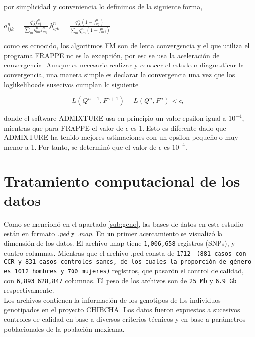por simplicidad y conveniencia lo definimos de la siguiente forma,\\

\begin{center}
$a_{ijk}^{n} = \frac{q_{ik}^{n}f_{kj}^{n}}{\sum_{m}q_{im}^{n}f_{mj}^{n}}$,$b_{ijk}^{n} = \frac{q_{ik}^{n}(1-f_{kj}^{n})}{\sum_{m}q_{im}^{n}(1-f_{mj}^{n})}$\\
\end{center}
  
\noindent como es conocido, los algoritmos EM son de lenta convergencia y el que utiliza el programa FRAPPE no es la excepci\'on, por eso se usa la aceleraci\'on de convergencia. Aunque es necesario realizar y conocer el estado o diagnosticar la convergencia, una manera simple es declarar la convergencia una vez que los loglikelihoods susecivos cumplan lo siguiente

\begin{equation}
  L(Q^{n+1},F^{n+1})-L(Q^{n},F^{n}) < \epsilon,
\end{equation}

\noindent donde el software ADMIXTURE usa en principio un valor epsilon igual a $10^{-4}$, mientras que para FRAPPE el valor de $\epsilon$ es 1. Esto es diferente dado que ADMIXTURE ha tenido mejores estimaciones con un epsilon pequeño o muy menor a 1. Por tanto, se determin\'o que el valor de $\epsilon$ es $10^{-4}$. 


\section{Tratamiento computacional de los datos}

Como se mencion\'o en el apartado \ref{sub:geno}, las bases de datos en este estudio est\'an en formato \textit{.ped} y \textit{.map}. En un primer acercamiento se visualiz\'o la dimensi\'on de los datos. El archivo .map tiene \texttt{1,006,658} registros (SNPs), y cuatro columnas. Mientras que el archivo .ped consta de \texttt{1712} \texttt{ (881 casos con CCR y 831 casos controles sanos, de los cuales la proporci\'on de g\'enero es 1012 hombres y 700 mujeres)} registros, que pasar\'on el control de calidad, con \texttt{6,893,628,847} columnas. El peso de los archivos son de \texttt{25 Mb} y \texttt{6.9 Gb} respectivamente.\\

Los archivos contienen la informaci\'on de los genotipos de los individuos genotipados en el proyecto CHIBCHA. Los datos fueron expuestos a sucesivos controles de calidad en base a diversos criterios t\'ecnicos y en base a par\'ametros poblacionales de la poblaci\'on mexicana.\\

